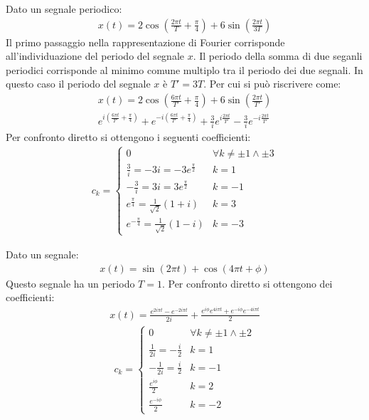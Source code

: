 \documentclass{article}
\begin{document}
Dato un segnale periodico:
\begin{gather*}
    x(t)=2\cos\displaystyle\left(\frac{2\pi t}{T}+\frac{\pi}{4}\right)+6\sin\left(\frac{2\pi t}{3T}\right)
\end{gather*}
Il primo passaggio nella rappresentazione di Fourier corrisponde all'individuazione del periodo del segnale $x$. Il periodo della somma di due seganli periodici corrisponde 
al minimo comune multiplo tra il periodo dei due segnali. In questo caso il periodo del segnale $x$ è $T'=3T$. Per cui si può riscrivere come:
\begin{gather*}
    x(t)=\displaystyle2\cos\left(\frac{6\pi t}{T'}+\frac{\pi}{4}\right)+6\sin\left(\frac{2\pi t}{T'}\right)\\
    \displaystyle e^{i\left(\frac{6\pi t}{T'}+\frac{\pi}{4}\right)}+e^{-i\left(\frac{6\pi t}{T'}+\frac{\pi}{4}\right)}+\frac{3}{i}e^{i\frac{2\pi t}{T'}}-\frac{3}{i}e^{-i\frac{2\pi t}{T'}}
\end{gather*} 
Per confronto diretto si ottengono i seguenti coefficienti:
\begin{gather}
    c_k=
    \begin{cases}
        0&\forall k\neq\pm1\land\pm3\\
        \displaystyle\frac{3}{i}=-3i=-3e^{\frac{\pi}{2}} &k=1\\
        -\displaystyle\frac{3}{i}=3i=3e^{\frac{\pi}{2}}&k=-1\\
        \displaystyle e^{\frac{\pi}{4}}=\frac{1}{\sqrt{2}}(1+i)&k=3\\
        \displaystyle e^{-\frac{\pi}{4}}=\frac{1}{\sqrt{2}}(1-i)&k=-3
    \end{cases}
\end{gather}


Dato un segnale:
\begin{gather*}
    x(t)=\sin\displaystyle(2\pi t)+\cos(4\pi t+\phi)
\end{gather*}
Questo segnale ha un periodo $T=1$. Per confronto diretto si ottengono dei coefficienti:
\begin{gather*}
    x(t)=\displaystyle \frac{e^{2i\pi t}-e^{-2i\pi t}}{2i}+\frac{e^{i\phi}e^{4i\pi t}+e^{-i\phi}e^{-4i\pi t}}{2}
\end{gather*}
\begin{gather}
    c_k=
    \begin{cases}
        0&\forall k\neq\pm1\land\pm2\\
        \displaystyle\frac{1}{2i}=-\frac{i}{2} &k=1\\
        -\displaystyle\frac{1}{2i}=\frac{i}{2}&k=-1\\
        \displaystyle\frac{e^{i\phi}}{2}&k=2\\
        \displaystyle\frac{e^{-i\phi}}{2}&k=-2
    \end{cases}
\end{gather}
\end{document}
